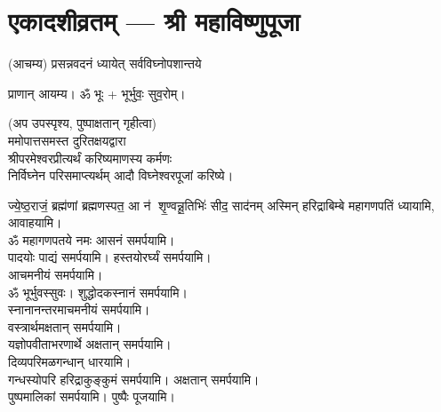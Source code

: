 
\setlength{\parindent}{0pt}
\chapter[एकादशीव्रतम्]{एकादशीव्रतम् — श्री महाविष्णुपूजा}


(आचम्य)
{प्रसन्नवदनं ध्यायेत् सर्वविघ्नोपशान्तये}
 
प्राणान्  आयम्य।  ॐ भूः + भूर्भुवः॒ सुव॒रोम्।
 
(अप उपस्पृश्य, पुष्पाक्षतान् गृहीत्वा)\\
ममोपात्तसमस्त दुरितक्षयद्वारा \\
श्रीपरमेश्वरप्रीत्यर्थं करिष्यमाणस्य कर्मणः\\
 निर्विघ्नेन परिसमाप्त्यर्थम् आदौ विघ्नेश्वरपूजां करिष्ये।

{ज्ये॒ष्ठ॒राजं॒ ब्रह्म॑णां ब्रह्मणस्पत॒ आ न॑ शृ॒ण्वन्नू॒तिभिः॑ सीद॒ साद॑नम्}
अस्मिन् हरिद्राबिम्बे महागणपतिं ध्यायामि, आवाहयामि।\\


ॐ महागणपतये नमः  आसनं समर्पयामि।\\
पादयोः पाद्यं समर्पयामि। हस्तयोरर्घ्यं समर्पयामि।\\
आचमनीयं समर्पयामि।\\
ॐ भूर्भुवस्सुवः। शुद्धोदकस्नानं समर्पयामि।\\
स्नानानन्तरमाचमनीयं समर्पयामि।\\
वस्त्रार्थमक्षतान् समर्पयामि।\\
यज्ञोपवीताभरणार्थे अक्षतान् समर्पयामि।\\
दिव्यपरिमळगन्धान् धारयामि।\\
गन्धस्योपरि हरिद्राकुङ्कुमं समर्पयामि। अक्षतान् समर्पयामि। \\
पुष्पमालिकां समर्पयामि। पुष्पैः पूजयामि।

